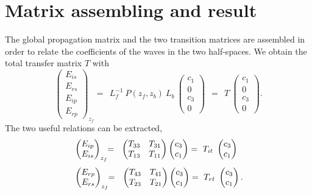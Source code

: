 \section{Matrix assembling and result}

The global propagation matrix and the two transition matrices are assembled in order to relate the coefficients of the waves in the two half-spaces.
We obtain the total transfer matrix $T$ with
$$
\begin{pmatrix}
E_{is}\\
E_{rs}\\
E_{ip}\\
E_{rp}
\end{pmatrix}_{z_f}
\!\!
= 
\ \ 
L_f^{-1}\ P(z_f, z_b)\ L_b \ 
\begin{pmatrix}
c_1\\ 0 \\ c_3\\ 0
\end{pmatrix} 
\ \ 
= 
\ \ 
T \ 
\begin{pmatrix}
c_1\\ 0 \\ c_3\\ 0
\end{pmatrix}.
$$
The two useful relations can be extracted,
\begin{align*}
& 
\begin{pmatrix}
E_{ip} \\ E_{is}
\end{pmatrix}_{z_f} \!\! = \ \ 
\begin{pmatrix}
T_{33} & T_{31} \\
T_{13} & T_{11} 
\end{pmatrix}
\begin{pmatrix}
c_3 \\ c_1
\end{pmatrix} = \ T_{it} \ 
\begin{pmatrix}
c_3 \\ c_1
\end{pmatrix}\hphantom{.} 
\\[3pt]
&
\begin{pmatrix}
E_{rp} \\ E_{rs} 
\end{pmatrix}_{z_f} \!\! = \ \ 
\begin{pmatrix}
T_{43} & T_{41} \\
T_{23} & T_{21} 
\end{pmatrix}
\begin{pmatrix}
c_3\\ c_1
\end{pmatrix} =\ T_{rt} \ 
\begin{pmatrix}
c_3\\ c_1
\end{pmatrix}.
\end{align*}

